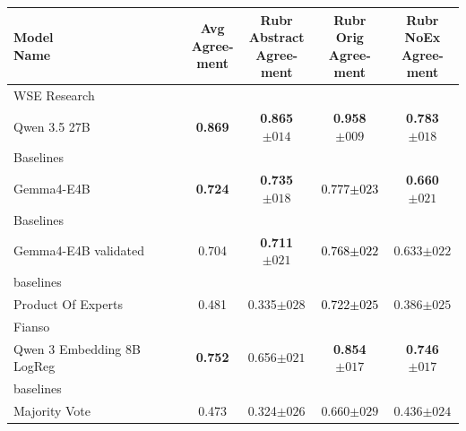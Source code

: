 \begin{tabularx}{\textwidth}{X | c c c c}
\hline
\makecell[b]{\textbf{Model} \\ \textbf{Name}} & \makecell[b]{\textbf{Avg} \\ \textbf{Agree-} \\ \textbf{ment}} & \makecell[b]{\textbf{Rubr} \\ \textbf{Abstract} \\ \textbf{Agree-} \\ \textbf{ment}} & \makecell[b]{\textbf{Rubr} \\ \textbf{Orig} \\ \textbf{Agree-} \\ \textbf{ment}} & \makecell[b]{\textbf{Rubr} \\ \textbf{NoEx} \\ \textbf{Agree-} \\ \textbf{ment}} \\
\hline
WSE Research\\\subcatarrow{}Qwen 3.5 27B & \textbf{\textcolor{BrickRed}{0.869}} & \textbf{\textcolor{BrickRed}{0.865$\pm{}014$}} & \textbf{\textcolor{BrickRed}{0.958$\pm{}009$}} & \textbf{\textcolor{BrickRed}{0.783$\pm{}018$}} \\
Baselines\\\subcatarrow{}Gemma4-E4B & \textbf{\textcolor{White!50!BrickRed}{0.724}} & \textbf{\textcolor{White!50!BrickRed}{0.735$\pm{}018$}} & \textcolor{Black}{0.777$\pm{}023$} & \textbf{\textcolor{White!50!BrickRed}{0.660$\pm{}021$}} \\
Baselines\\\subcatarrow{}Gemma4-E4B validated & \textcolor{White!50!BrickRed}{0.704} & \textbf{\textcolor{White!50!BrickRed}{0.711$\pm{}021$}} & \textcolor{Black}{0.768$\pm{}022$} & \textcolor{White!50!BrickRed}{0.633$\pm{}022$} \\
baselines\\\subcatarrow{}Product Of Experts & \textcolor{White!50!NavyBlue}{0.481} & \textcolor{NavyBlue}{0.335$\pm{}028$} & \textcolor{Black}{0.722$\pm{}025$} & \textcolor{White!50!NavyBlue}{0.386$\pm{}025$} \\
Fianso\\\subcatarrow{}Qwen 3 Embedding 8B LogReg & \textbf{\textcolor{White!50!BrickRed}{0.752}} & \textcolor{White!50!BrickRed}{0.656$\pm{}021$} & \textbf{\textcolor{White!50!BrickRed}{0.854$\pm{}017$}} & \textbf{\textcolor{BrickRed}{0.746$\pm{}017$}} \\
baselines\\\subcatarrow{}Majority Vote & \textcolor{White!50!NavyBlue}{0.473} & \textcolor{NavyBlue}{0.324$\pm{}026$} & \textcolor{White!50!NavyBlue}{0.660$\pm{}029$} & \textcolor{White!50!NavyBlue}{0.436$\pm{}024$} \\

\end{tabularx}
